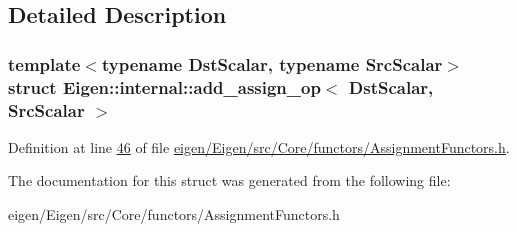 \subsection{Detailed Description}
\subsubsection*{template$<$typename Dst\+Scalar, typename Src\+Scalar$>$\newline
struct Eigen\+::internal\+::add\+\_\+assign\+\_\+op$<$ Dst\+Scalar, Src\+Scalar $>$}



Definition at line \hyperlink{eigen_2_eigen_2src_2_core_2functors_2_assignment_functors_8h_source_l00046}{46} of file \hyperlink{eigen_2_eigen_2src_2_core_2functors_2_assignment_functors_8h_source}{eigen/\+Eigen/src/\+Core/functors/\+Assignment\+Functors.\+h}.



The documentation for this struct was generated from the following file\+:\begin{DoxyCompactItemize}
\item 
eigen/\+Eigen/src/\+Core/functors/\+Assignment\+Functors.\+h\end{DoxyCompactItemize}
